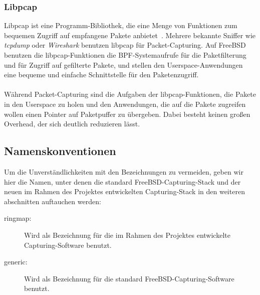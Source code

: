 \subsubsection{Libpcap}\label{sec:libpcap}
Libpcap ist eine Programm-Bibliothek, die eine Menge von Funktionen zum
bequemen Zugriff auf empfangene Pakete anbietet~\cite{man_pcap}. Mehrere
bekannte Sniffer wie \emph{tcpdump} oder \emph{Wireshark} benutzen libpcap für
Packet-Capturing.  Auf FreeBSD benutzen die libpcap-Funktionen  die
BPF-Systemaufrufe für die Paketfilterung und für Zugriff auf gefilterte Pakete,
und stellen den Userspace-Anwendungen eine bequeme und einfache Schnittstelle für
den Paketenzugriff.\\\\
%
Während Packet-Capturing sind die Aufgaben der libpcap-Funktionen, die Pakete
in den Userspace zu holen und den Anwendungen, die auf die Pakete zugreifen
wollen einen Pointer auf Paketpuffer zu übergeben. Dabei besteht keinen großen
Overhead, der sich deutlich reduzieren lässt.


\subsection{Namenskonventionen}
Um die Unverständlichkeiten mit den Bezeichnungen zu vermeiden, geben wir 
hier die Namen, unter denen die standard FreeBSD-Capturing-Stack und 
der neuen im Rahmen des Projektes entwickelten Capturing-Stack in den 
weiteren abschnitten auftauchen werden: 
\begin{description}
	\item[ringmap:] Wird als Bezeichnung für die im Rahmen des Projektes 
		entwickelte Capturing-Software benutzt. 
	\item [generic:] Wird als Bezeichnung für die standard
		FreeBSD-Capturing-Software benutzt.
\end{description}

